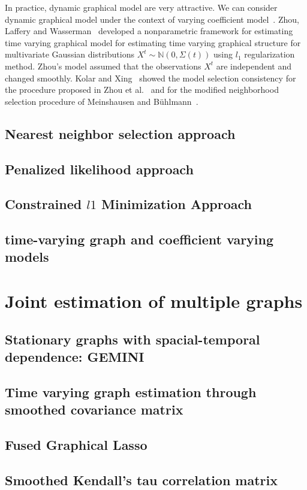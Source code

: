 \documentclass[11pt]{article}
\begin{document}
In practice, dynamic graphical model are very attractive. We can consider dynamic graphical model under the context of varying coefficient model~\cite{hastie1993varying, fan1999statistical, fan2008statistical}. Zhou, Laffery and Wasserman~\cite{zhou2010time} developed a nonparametric framework for estimating time varying graphical model for estimating time varying graphical structure for multivariate Gaussian distributions $X^t \sim \mathbb{N}(0, \Sigma(t))$ using $l_1$ regularization method. Zhou's model assumed that the observations $X^t$ are independent and changed smoothly. Kolar and Xing~\cite{kolar2011time} showed the model selection consistency for the procedure proposed in Zhou et al.~\cite{zhou2010time} and for the modified neighborhood selection procedure of Meinshausen and B{\"u}hlmann~\cite{meinshausen2006high}. 


\subsection{Nearest neighbor selection approach}

\subsection{Penalized likelihood approach}

\subsection{Constrained $l1$ Minimization Approach}

\subsection{time-varying graph and coefficient varying models}

\section{Joint estimation of multiple graphs}

\subsection{Stationary graphs with spacial-temporal dependence: GEMINI}

\subsection{Time varying graph estimation through smoothed covariance matrix}

\subsection{Fused Graphical Lasso}

\subsection{Smoothed Kendall's tau correlation matrix}



\end{document}
